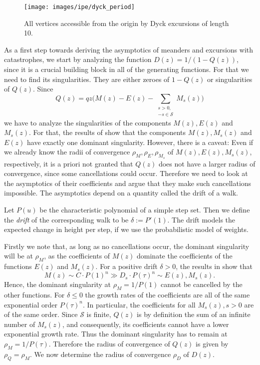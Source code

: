 \begin{figure}[hbt!]
  \centering
  \texttt{[image: images/ipe/dyck\_period]}
  \caption{All vertices accessible from the origin by Dyck excursions of length 10.}
  \label{fig:dyck_period}
\end{figure}

As a first step towards deriving the asymptotics of meanders and excursions with catastrophes, we start by analyzing the function $D(z) = 1/(1-Q(z))$, since it is a crucial building block in all of the generating functions. For that we need to find its singularities. They are either zeroes of $1 - Q(z)$ or singularities of $Q(z)$. Since
$$
Q(z) = q z\Bigg(M(z) - E(z) - \sum_{\substack{s > 0, \\ -s\in \mathcal{S}}} M_s(z)\Bigg)
$$
we have to analyze the singularities of the components $M(z), E(z)$ and $M_s(z)$. For that, the results of \cite[Theorem~3, Theorem~4]{Basic} show that the components $M(z), M_s(z)$ and $E(z)$ have exactly one dominant singularity.
However, there is a caveat: Even if we already know the radii of convergence $\rho_M,\rho_E,\rho_{M_s}$ of $M(z), E(z), M_s(z)$, respectively, it is a priori not granted that $Q(z)$ does not have a larger radius of convergence, since some cancellations could occur. 
Therefore we need to look at the asymptotics of their coefficients and argue that they make such cancellations impossible.
The asymptotics depend on a quantity called the drift of a walk.

\begin{definition}[Drift]
  Let $P(u)$ be the characteristic polynomial of a simple step set. Then we define the \textit{drift} of the corresponding walk to be $\delta := P'(1)$. The drift models the expected change in height per step, if we use the probabilistic model of weights.
\end{definition}

Firstly we note that, as long as no cancellations occur, the dominant singularity will be at $\rho_M$, as the coefficients of $M(z)$ dominate the coefficients of the functions $E(z)$ and $M_s(z)$.
For a positive drift $\delta > 0$, the results in \cite[Theorem 3, Theorem 4]{Basic} show that $$
  M(z) \sim C \cdot P(1)^n \gg D_s \cdot P(\tau)^n \sim E(z), M_s(z).
$$
Hence, the dominant singularity at $\rho_M = 1/P(1)$ cannot be cancelled by the other functions.
For $\delta \leq 0$ the growth rates of the coefficients are all of the same exponential order $P(\tau)^n$. In particular, the coefficients for all $M_s(z), s > 0$ are of the same order. Since $\mathcal{S}$ is finite, $Q(z)$ is by definition the sum of an infinite number of $M_s(z)$, and consequently, its coefficients cannot have a lower exponential growth rate.
Thus the dominant singularity has to remain at $\rho_M = 1/P(\tau)$.
Therefore the radius of convergence of $Q(z)$ is given by $\rho_Q = \rho_M$. 
We now determine the radius of convergence $\rho_D$ of $D(z)$.

